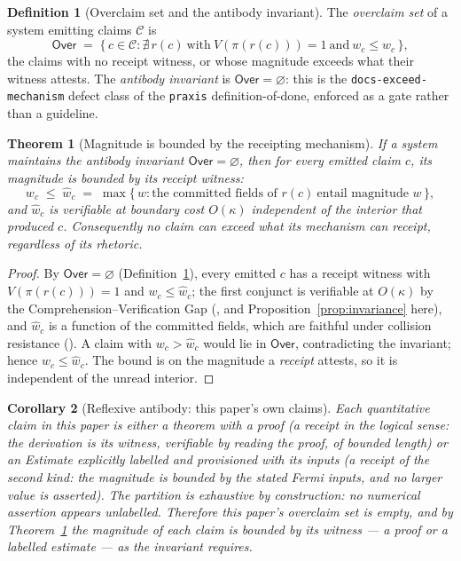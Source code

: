 \documentclass[11pt,oneside]{book}
\theoremstyle{definition}
\newtheorem{definition}{Definition}[chapter]
\theoremstyle{plain}
\newtheorem{theorem}{Theorem}[chapter]
\newtheorem{corollary}[theorem]{Corollary}
\theoremstyle{remark}
\newcommand{\Proj}{\pi}                        %
\newcommand{\CL}{\kappa}                       %
\newcommand{\code}[1]{\texttt{#1}}
\newcommand{\Over}{\mathsf{Over}}
\begin{document}
\begin{definition}[Overclaim set and the antibody invariant]\label{def:over}
The \emph{overclaim set} of a system emitting claims $\mathcal C$ is
\[
\Over\;=\;\{\,c\in\mathcal C : \nexists\,r(c)\ \text{with}\ V(\Proj(r(c)))=1\ \text{and}\ w_c\le\widehat w_c\,\},
\]
the claims with no receipt witness, or whose magnitude exceeds what their witness attests. The
\emph{antibody invariant} is $\Over=\varnothing$: this is the \code{docs-exceed-mechanism} defect
class of the \code{praxis} definition-of-done, enforced as a gate rather than a guideline.
\end{definition}

\begin{theorem}[Magnitude is bounded by the receipting mechanism]\label{thm:magnitude}
If a system maintains the antibody invariant $\Over=\varnothing$, then for every emitted claim
$c$, its magnitude is bounded by its receipt witness:
\[
w_c\;\le\;\widehat w_c\;=\;\max\{\,w : \text{the committed fields of } r(c)\ \text{entail magnitude } w\,\},
\]
and $\widehat w_c$ is verifiable at boundary cost $O(\CL)$ independent of the interior that
produced $c$. Consequently no claim can exceed what its mechanism can receipt, regardless of its
rhetoric.
\end{theorem}

\begin{proof}
By $\Over=\varnothing$ (Definition~\ref{def:over}), every emitted $c$ has a receipt witness with
$V(\Proj(r(c)))=1$ and $w_c\le\widehat w_c$; the first conjunct is verifiable at $O(\CL)$ by the
Comprehension--Verification Gap (\cite[Thm.~4.2]{keystone}, and Proposition~\ref{prop:invariance}
here), and $\widehat w_c$ is a function of the committed fields, which are faithful under
collision resistance (\cite[Thm.~3.2]{keystone}). A claim with $w_c>\widehat w_c$ would lie in
$\Over$, contradicting the invariant; hence $w_c\le\widehat w_c$. The bound is on the magnitude a
\emph{receipt} attests, so it is independent of the unread interior.
\end{proof}

\begin{corollary}[Reflexive antibody: this paper's own claims]\label{cor:reflexive}
Each quantitative claim in this paper is either a theorem with a proof (a receipt in the logical
sense: the derivation is its witness, verifiable by reading the proof, of bounded length) or an
\emph{Estimate} explicitly labelled and provisioned with its inputs (a receipt of the second kind:
the magnitude is bounded by the stated Fermi inputs, and no larger value is asserted). The
partition is exhaustive by construction: no numerical assertion appears unlabelled. Therefore this
paper's overclaim set is empty, and by Theorem~\ref{thm:magnitude} the magnitude of each claim is
bounded by its witness --- a proof or a labelled estimate --- as the invariant requires.
\end{corollary}
\end{document}
